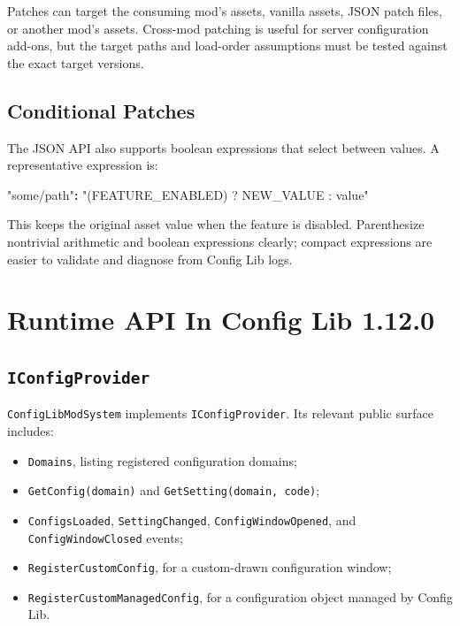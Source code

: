 \documentclass[
  11pt,
  letterpaper,
  titlepage]{article}
\newenvironment{Shaded}{\begin{snugshade}}{\end{snugshade}}
\newcommand{\ErrorTok}[1]{\textcolor[rgb]{0.64,0.00,0.00}{\textbf{#1}}}
\newcommand{\StringTok}[1]{\textcolor[rgb]{0.31,0.60,0.02}{#1}}
\providecommand{\tightlist}{%
  \setlength{\itemsep}{0pt}\setlength{\parskip}{0pt}}
\begin{document}
Patches can target the consuming mod's assets, vanilla assets, JSON
patch files, or another mod's assets. Cross-mod patching is useful for
server configuration add-ons, but the target paths and load-order
assumptions must be tested against the exact target versions.

\subsection{Conditional Patches}\label{conditional-patches}

The JSON API also supports boolean expressions that select between
values. A representative expression is:

\begin{Shaded}
\begin{Highlighting}[]
\StringTok{"some/path"}\ErrorTok{:} \StringTok{"(FEATURE\_ENABLED) ? NEW\_VALUE : value"}
\end{Highlighting}
\end{Shaded}

This keeps the original asset value when the feature is disabled.
Parenthesize nontrivial arithmetic and boolean expressions clearly;
compact expressions are easier to validate and diagnose from Config Lib
logs.

\section{Runtime API In Config Lib
1.12.0}\label{runtime-api-in-config-lib-1.12.0}

\subsection{\texorpdfstring{\texttt{IConfigProvider}}{IConfigProvider}}\label{iconfigprovider}

\texttt{ConfigLibModSystem} implements \texttt{IConfigProvider}. Its
relevant public surface includes:

\begin{itemize}
\tightlist
\item
  \texttt{Domains}, listing registered configuration domains;
\item
  \texttt{GetConfig(domain)} and \texttt{GetSetting(domain,\ code)};
\item
  \texttt{ConfigsLoaded}, \texttt{SettingChanged},
  \texttt{ConfigWindowOpened}, and \texttt{ConfigWindowClosed} events;
\item
  \texttt{RegisterCustomConfig}, for a custom-drawn configuration
  window;
\item
  \texttt{RegisterCustomManagedConfig}, for a configuration object
  managed by Config Lib.
\end{itemize}
\end{document}
